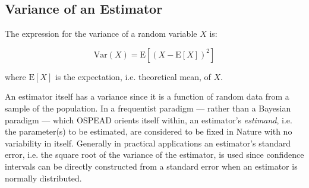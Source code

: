 \documentclass[english]{article}
\begin{document}
\subsection{Variance of an Estimator\label{subsec:Variance-of-an-Estimator}}

The expression for the variance of a random variable $X$ is:

\[
\mathrm{Var}(X)=\mathrm{E}\left[\left(X-\mathrm{E}[X]\right)^{2}\right]
\]

where $\mathrm{E}[X]$ is the expectation, i.e. theoretical mean,
of $X$.

An estimator itself has a variance since it is a function of random
data from a sample of the population. In a frequentist paradigm ---
rather than a Bayesian paradigm --- which OSPEAD orients itself within,
an estimator's \textit{estimand}, i.e. the parameter(s) to be estimated,
are considered to be fixed in Nature with no variability in itself.
Generally in practical applications an estimator's standard error,
i.e. the square root of the variance of the estimator, is used since
confidence intervals can be directly constructed from a standard error
when an estimator is normally distributed.
\end{document}
